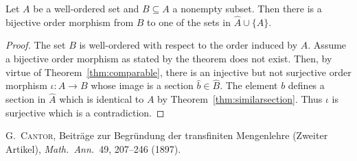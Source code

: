 \documentclass[12pt]{article}
\newcommand{\<}{\langle}
\renewcommand{\>}{\rangle}
\newcommand{\h}{\widehat}
\begin{document}
\begin{thm}
Let $A$ be a well-ordered set and $B\subseteq A$ a nonempty
subset. Then there is a bijective order morphism from $B$ to one of
the sets in $\h{A}\cup\{A\}$.
\end{thm}
\begin{proof}
The set $B$ is well-ordered with respect to the order induced by
$A$. Assume a bijective order morphism as stated by the theorem does
not exist. Then, by virtue of Theorem~\ref{thm:comparable}, there is
an injective but not surjective order morphism $\iota\colon A\to B$ whose
image is a section $\h{b}\in\h{B}$. The element $b$ defines a section
in $\h{A}$ which is identical to $A$ by
Theorem~\ref{thm:similarsection}. Thus $\iota$ is surjective which is
a contradiction. 
\end{proof}

\begin{thebibliography}{C}

 \textsc{G.~Cantor}, Beitr\"{a}ge zur Begr\"{u}ndung der
  transfiniten Mengenlehre (Zweiter Artikel), \emph{Math.\ Ann.}\ 49,
  207--246 (1897).

\end{thebibliography}
\end{document}
